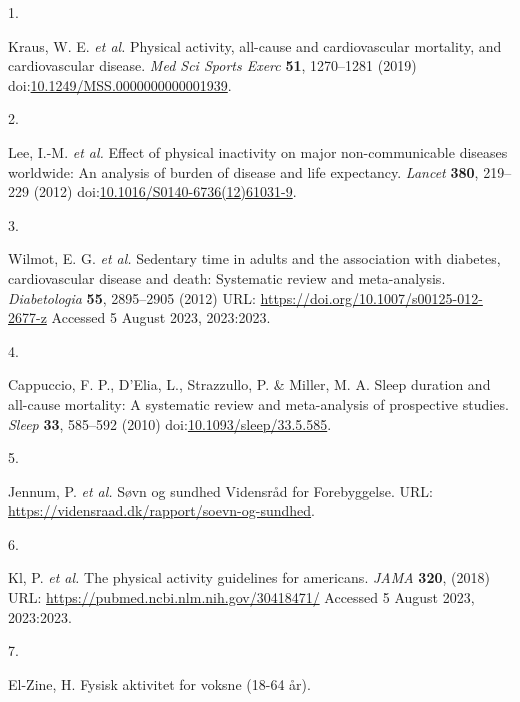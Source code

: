 \documentclass[
  10pt,
]{scrbook}
\newlength{\cslhangindent}
\newlength{\csllabelwidth}
\newlength{\cslentryspacingunit} %
\newenvironment{CSLReferences}[2] %
 {%
  \setlength{\parindent}{0pt}
  \ifodd #1
  \let\oldpar\par
  \def\par{\hangindent=\cslhangindent\oldpar}
  \fi
  \setlength{\parskip}{#2\cslentryspacingunit}
 }%
 {}
\newcommand{\CSLLeftMargin}[1]{\parbox[t]{\csllabelwidth}{#1}}
\newcommand{\CSLRightInline}[1]{\parbox[t]{\linewidth - \csllabelwidth}{#1}\break}
\let\originaltextbf\textbf
\renewcommand{\textbf}[1]{\textcolor{color1}{\textsf{\originaltextbf{#1}}}}
\begin{document}
\hypertarget{refs}{}
\begin{CSLReferences}{0}{0}
\leavevmode{}%
\CSLLeftMargin{1. }%
\CSLRightInline{Kraus, W. E. \emph{et al.} Physical activity, all-cause
and cardiovascular mortality, and cardiovascular disease. \emph{Med Sci
Sports Exerc} \textbf{51}, 1270--1281 (2019)
doi:\href{https://doi.org/10.1249/MSS.0000000000001939}{10.1249/MSS.0000000000001939}.}

\leavevmode{}%
\CSLLeftMargin{2. }%
\CSLRightInline{Lee, I.-M. \emph{et al.} Effect of physical inactivity
on major non-communicable diseases worldwide: An analysis of burden of
disease and life expectancy. \emph{Lancet} \textbf{380}, 219--229 (2012)
doi:\href{https://doi.org/10.1016/S0140-6736(12)61031-9}{10.1016/S0140-6736(12)61031-9}.}

\leavevmode{}%
\CSLLeftMargin{3. }%
\CSLRightInline{Wilmot, E. G. \emph{et al.} Sedentary time in adults and
the association with diabetes, cardiovascular disease and death:
Systematic review and meta-analysis. \emph{Diabetologia} \textbf{55},
2895--2905 (2012) URL: \url{https://doi.org/10.1007/s00125-012-2677-z}
Accessed 5 August 2023, 2023:2023.}

\leavevmode{}%
\CSLLeftMargin{4. }%
\CSLRightInline{Cappuccio, F. P., D'Elia, L., Strazzullo, P. \& Miller,
M. A. Sleep duration and all-cause mortality: A systematic review and
meta-analysis of prospective studies. \emph{Sleep} \textbf{33}, 585--592
(2010)
doi:\href{https://doi.org/10.1093/sleep/33.5.585}{10.1093/sleep/33.5.585}.}

\leavevmode{}%
\CSLLeftMargin{5. }%
\CSLRightInline{Jennum, P. \emph{et al.} Søvn og sundhed \textbar{}
Vidensråd for Forebyggelse. URL:
\url{https://vidensraad.dk/rapport/soevn-og-sundhed}.}

\leavevmode{}%
\CSLLeftMargin{6. }%
\CSLRightInline{Kl, P. \emph{et al.} The physical activity guidelines
for americans. \emph{{JAMA}} \textbf{320}, (2018) URL:
\url{https://pubmed.ncbi.nlm.nih.gov/30418471/} Accessed 5 August 2023,
2023:2023.}

\leavevmode{}%
\CSLLeftMargin{7. }%
\CSLRightInline{El-Zine, H. Fysisk aktivitet for voksne (18-64 år).}


\end{CSLReferences}
\end{document}
